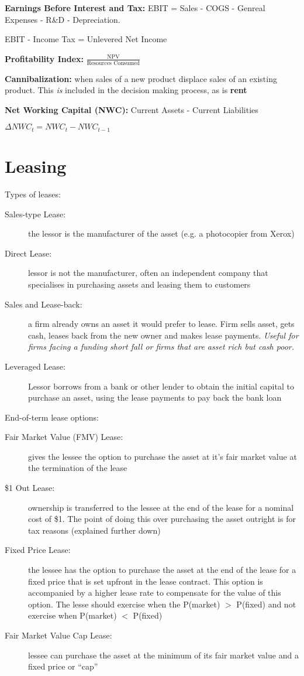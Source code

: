 \documentclass{report}
\begin{document}
\textbf{Earnings Before Interest and Tax:} EBIT = Sales - COGS - Genreal Expenses - R\&D - Depreciation.

EBIT - Income Tax = Unlevered Net Income


\vspace*{1\baselineskip}
\textbf{Profitability Index:} $\frac{\mbox{NPV}}{\mbox{Resources Consumed}}$

\vspace*{1\baselineskip}
\textbf{Cannibalization:} when sales of a new product displace sales of an existing product. This \textit{is} included in the decision making process, as is \textbf{rent}

\textbf{Net Working Capital (NWC):} Current Assets - Current Liabilities

\textbf{$\Delta NWC_t=NWC_t-NWC_{t-1}$}
\newpage
\section{Leasing}
\label{sec:leasing}

Types of leases:
\begin{description}
\item[Sales-type Lease:] the lessor is the manufacturer of the asset (e.g. a photocopier from Xerox)
\item[Direct Lease:] lessor is not the manufacturer, often an independent company that specialises in purchasing assets and leasing them to customers 
\item[Sales and Lease-back:] a firm already owns an asset it would prefer to lease. Firm sells asset, gets cash, leases back from the new owner and makes lease payments. \textit{Useful for firms facing a funding short fall or firms that are asset rich but cash poor.}
\item[Leveraged Lease:] Lessor borrows from a bank or other lender to obtain the initial capital to purchase an asset, using the lease payments to pay back the bank loan  
\end{description}

End-of-term lease options:
\begin{description}
\item[Fair Market Value (FMV) Lease:] gives the lessee the option to purchase the asset at it's fair market value at the termination of the lease
\item[\$1 Out Lease:] ownership is transferred to the lessee at the end of the lease for a nominal cost of \$1. The point of doing this over purchasing the asset outright is for tax reasons (explained further down)
\item[Fixed Price Lease:] the lessee has the option to purchase the asset at the end of the lease for a fixed price that is set upfront in the lease contract. This option is accompanied by a higher lease rate to compensate for the value of this option. The lesse should exercise when the P(market) $>$ P(fixed) and not exercise when P(market) $<$ P(fixed)
\item[Fair Market Value Cap Lease:] lessee can purchase the asset at the minimum of its fair market value and a fixed price or ``cap''  
\end{description}
\end{document}
